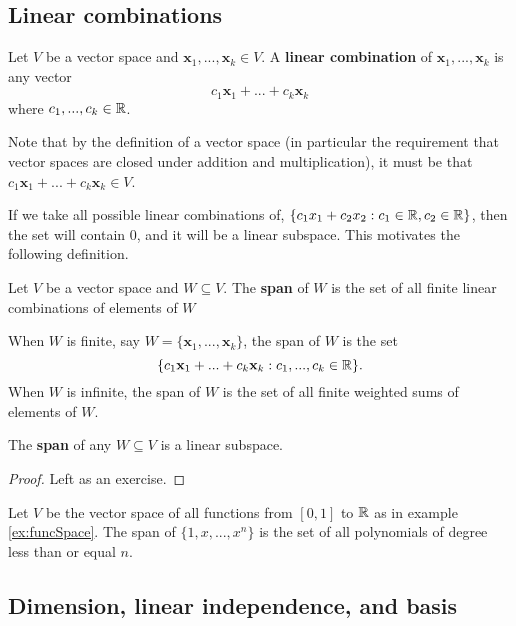 \subsection{Linear combinations}

\begin{definition}
  Let $V$ be a vector space and $\mathbf{x}_1,..., \mathbf{x}_k \in
  V$. A \textbf{linear combination} of $\mathbf{x}_1,...,
  \mathbf{x}_k$ is any vector
  \[c_1 \mathbf{x}_1 + ... + c_k \mathbf{x}_k \]
  where $c_1, ..., c_k \in \mathbb{R}$. 
\end{definition}
Note that by the definition of a vector space (in particular the
requirement that vector spaces are closed under addition and
multiplication), it must be that $c_1 \mathbf{x}_1 + ... + c_k \mathbf{x}_k \in V$. 

If we take all possible linear combinations of, $\{c_1 x_1 + c_2
x_2 : c_1 \in \mathbb{R}, c_2 \in \mathbb{R}\}$, then the set will contain $0$, and it
will be a linear subspace. This motivates the following definition.
\begin{definition}
  Let $V$ be a vector space and $W \subseteq V$. The
  \textbf{span} of $W$ is the set
  of all finite linear combinations of elements of $W$
\end{definition}
When $W$ is finite, say $W = \{\mathbf{x}_1, ..., \mathbf{x}_k\}$, the span of $W$ is
the set 
\[ \{ c_1 \mathbf{x}_1 + ... + c_k \mathbf{x}_k : c_1, ..., c_k \in \mathbb{R}
\}. \] 
When $W$ is infinite, the span of $W$ is the set of all finite
weighted sums of elements of $W$.
\begin{lemma}
  The \textbf{span} of any  $W \subseteq V$ is a linear subspace.
\end{lemma}
\begin{proof}
  Left as an exercise.
\end{proof}

\begin{example}
  Let $V$ be the vector space of all functions from $[0,1]$ to $\mathbb{R}$ as
  in example \ref{ex:funcSpace}. The span of $\{1, x, ..., x^n\}$ is
  the set of all polynomials of degree less than or equal $n$.
\end{example}

\subsection{Dimension, linear independence, and basis} 

